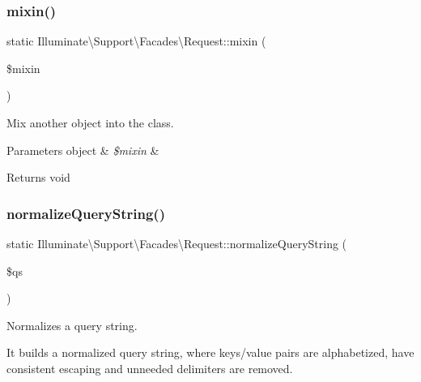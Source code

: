 \subsubsection{\texorpdfstring{mixin()}{mixin()}}
{\footnotesize\ttfamily static Illuminate\textbackslash{}\+Support\textbackslash{}\+Facades\textbackslash{}\+Request\+::mixin (\begin{DoxyParamCaption}\item[{}]{\$mixin }\end{DoxyParamCaption})\hspace{0.3cm}{\ttfamily [static]}}

Mix another object into the class.


\begin{DoxyParams}[1]{Parameters}
object & {\em \$mixin} & \\
\hline
\end{DoxyParams}
\begin{DoxyReturn}{Returns}
void 
\end{DoxyReturn}
\mbox{\label{class_illuminate_1_1_support_1_1_facades_1_1_request_a4e65d88d0e7c68e2b9aaafcfe83a91b5}} 
\subsubsection{\texorpdfstring{normalize\+Query\+String()}{normalizeQueryString()}}
{\footnotesize\ttfamily static Illuminate\textbackslash{}\+Support\textbackslash{}\+Facades\textbackslash{}\+Request\+::normalize\+Query\+String (\begin{DoxyParamCaption}\item[{}]{\$qs }\end{DoxyParamCaption})\hspace{0.3cm}{\ttfamily [static]}}

Normalizes a query string.

It builds a normalized query string, where keys/value pairs are alphabetized, have consistent escaping and unneeded delimiters are removed.



